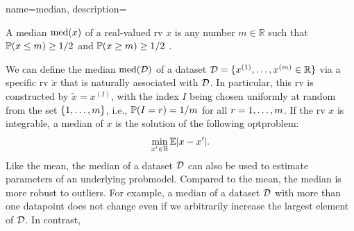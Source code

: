 {name={median},
	description={A median $\mathrm{med}(x)$ of a real-valued \gls{rv} $x$ 
		is any number $m \in \mathbb{R}$ such that $\mathbb{P}({ x \leq m}) \geq 1/2$ and $\mathbb{P}({ x \geq m}) \geq 1/2$ \cite{LC}. 
 		\begin{figure}[H]
			\begin{center}
			\end{center}
 		\end{figure}  
 		We can define the median $\mathrm{med}(\mathcal{D})$ 
 		of a \gls{dataset} $\mathcal{D} = \{ x^{(1)}, \ldots, x^{(m)} \in \mathbb{R} \}$ 
 		via a specific \gls{rv} $\tilde{x}$ that is naturally associated with $\mathcal{D}$. 
 		In particular, this \gls{rv} is constructed by $\tilde{x} = x^{(I)}$, with the index $I$ 
 		being chosen uniformly at random from the set $\{1,\ldots,m\}$, i.e., $\mathbb{P}({I = r})=1/m$ for 
 		all $r=1,\ldots,m$. If the \gls{rv} $x$ is integrable, a median of $x$ 
 		is the solution of the following \gls{optproblem}: 
 		$$\min_{x' \in \mathbb{R}} \mathbb{E}{|x - x'|}.$$ 
 		Like the \gls{mean}, the median of a \gls{dataset} $\mathcal{D}$ can also be used 
 		to estimate \gls{parameter}s of an underlying \gls{probmodel}. Compared 
 		to the \gls{mean}, the median is more robust to \gls{outlier}s. For example, 
 		a median of a \gls{dataset} $\mathcal{D}$ with more than one \gls{datapoint} does not 
 		change even if we arbitrarily increase the largest element of $\mathcal{D}$. In contrast, 
}}
